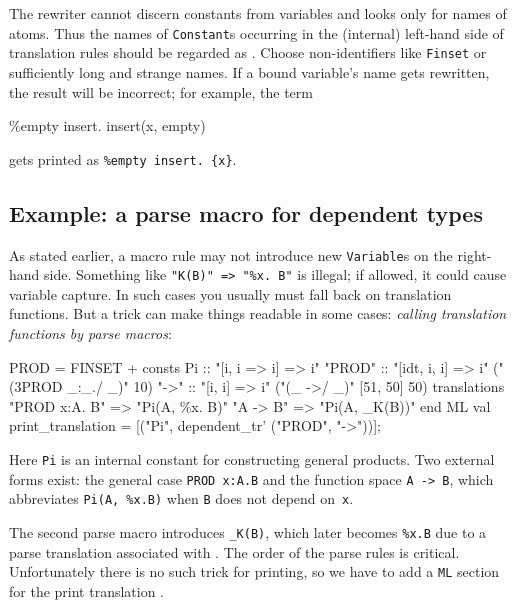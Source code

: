\begin{warn}
  The \AST{} rewriter cannot discern constants from variables and looks
  only for names of atoms.  Thus the names of {\tt Constant}s occurring in
  the (internal) left-hand side of translation rules should be regarded as
  .  Choose non-identifiers like {\tt\at Finset} or
  sufficiently long and strange names.  If a bound variable's name gets
  rewritten, the result will be incorrect; for example, the term
\begin{ttbox}
\%empty insert. insert(x, empty)
\end{ttbox}
  gets printed as \verb|%empty insert. {x}|.
\end{warn}


\subsection{Example: a parse macro for dependent types}\label{prod_trans}

As stated earlier, a macro rule may not introduce new {\tt Variable}s on
the right-hand side.  Something like \verb|"K(B)" => "%x. B"| is illegal;
if allowed, it could cause variable capture.  In such cases you usually
must fall back on translation functions.  But a trick can make things
readable in some cases: {\em calling translation functions by parse
  macros}:
\begin{ttbox}
PROD = FINSET +
consts
  Pi            :: "[i, i => i] => i"
  "{\at}PROD"       :: "[idt, i, i] => i"     ("(3PROD _:_./ _)" 10)
  "{\at}->"         :: "[i, i] => i"          ("(_ ->/ _)" [51, 50] 50)
\ttbreak
translations
  "PROD x:A. B" => "Pi(A, \%x. B)"
  "A -> B"      => "Pi(A, _K(B))"
end
ML
  val print_translation = [("Pi", dependent_tr' ("{\at}PROD", "{\at}->"))];
\end{ttbox}

Here {\tt Pi} is an internal constant for constructing general products.
Two external forms exist: the general case {\tt PROD x:A.B} and the
function space {\tt A -> B}, which abbreviates \verb|Pi(A, %x.B)| when {\tt B}
does not depend on~{\tt x}.

The second parse macro introduces {\tt _K(B)}, which later becomes \verb|%x.B|
due to a parse translation associated with .  The order of the
parse rules is critical.  Unfortunately there is no such trick for
printing, so we have to add a {\tt ML} section for the print translation
.

